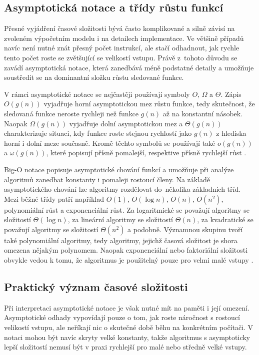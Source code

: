 \subsection{Asymptotická notace a třídy růstu funkcí}
Přesné vyjádření časové složitosti bývá často komplikované a silně závisí na zvoleném výpočetním modelu i na detailech implementace. Ve většině případů navíc není nutné znát přesný počet instrukcí, ale stačí odhadnout, jak rychle tento počet roste se zvětšující se velikostí vstupu. Právě z~tohoto důvodu se zavádí asymptotická notace, která zanedbává méně podstatné detaily a umožňuje soustředit se na dominantní složku růstu sledované funkce.

V rámci asymptotické notace se nejčastěji používají symboly \(O\), \(\Omega\) a \(\Theta\). Zápis \(O(g(n))\) vyjadřuje horní asymptotickou mez růstu funkce, tedy skutečnost, že sledovaná funkce neroste rychleji než funkce \(g(n)\) až na konstantní násobek. Naopak \(\Omega(g(n))\) vyjadřuje dolní asymptotickou mez a \(\Theta(g(n))\) charakterizuje situaci, kdy funkce roste stejnou rychlostí jako \(g(n)\) z hlediska horní i dolní meze současně. Kromě těchto symbolů se používají také \(o(g(n))\) a \(\omega(g(n))\), které popisují přísně pomalejší, respektive přísně rychlejší růst \cite{sawa_ti_03}.

Big-O notace popisuje asymptotické chování funkcí a umožňuje při analýze algoritmů zanedbat konstanty i pomaleji rostoucí členy. Na základě asymptotického chování lze algoritmy rozdělovat do~několika základních tříd. Mezi běžné třídy patří například \(O(1)\), \(O(\log n)\), \(O(n)\), \(O(n^2)\), polynomiální růst a exponenciální růst. Za logaritmické se považují algoritmy se složitostí \(\Theta(\log n)\), za lineární algoritmy se složitostí \(\Theta(n)\), za kvadratické se považují algoritmy se složitostí \(\Theta(n^2)\) a podobně. Významnou skupinu tvoří také polynomiální algoritmy, tedy algoritmy, jejichž časová složitost je shora omezena nějakým polynomem. Naopak exponenciální nebo faktoriální složitosti obvykle vedou k tomu, že algoritmus je použitelný pouze pro velmi malé vstupy \cite{mit_big_o}.

\subsection{Praktický význam časové složitosti}
Při interpretaci asymptotické notace je však nutné mít na paměti i její omezení. Asymptotické odhady vypovídají pouze o tom, jak roste náročnost s rostoucí velikostí vstupu, ale neříkají nic o skutečné době běhu na konkrétním počítači. V notaci mohou být navíc skryty velké konstanty, takže algoritmus s asymptoticky lepší složitostí nemusí být v praxi rychlejší pro malé nebo středně velké vstupy.

